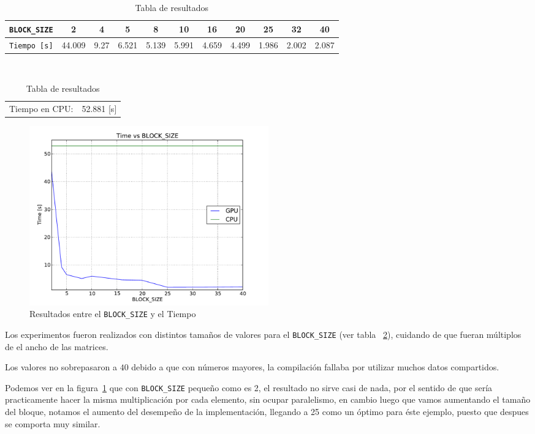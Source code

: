 \begin{table}[!ht]
\begin{center}
	\begin{tabular}{|l|c|c|c|c|c|c|c|c|c|c|}
		\hline
		\texttt{BLOCK\_SIZE} & 2 & 4 & 5 & 8 & 10 & 16 & 20 & 25 & 32 & 40 \\\hline
		\texttt{Tiempo [s]}  & 44.009 & 9.27 & 6.521 & 5.139 & 5.991 & 4.659 & 4.499 & 1.986 & 2.002 & 2.087 \\\hline
	\end{tabular}
	\\
	\begin{tabular}{cc}
		Tiempo en CPU: & 52.881 [s] \\
	\end{tabular}
\end{center}
\caption{Tabla de resultados}
\label{table:1}
\end{table}

\begin{figure}
\begin{center}
	\includegraphics[width=0.5\textwidth]{img/plot-proyecto.pdf}
\end{center}
\caption{Resultados entre el \texttt{BLOCK\_SIZE} y el Tiempo}
\label{fig:1}
\end{figure}

Los experimentos fueron realizados con distintos tamaños de
valores para el \texttt{BLOCK\_SIZE} (ver tabla ~\ref{table:1}), cuidando de que fueran
múltiplos de el ancho de las matrices.

Los valores no sobrepasaron a $40$ debido a que con números
mayores, la compilación fallaba por utilizar muchos datos compartidos.

Podemos ver en la figura~\ref{fig:1} que con \texttt{BLOCK\_SIZE} pequeño como es 2,
el resultado no sirve casi de nada, por el sentido de que sería practicamente hacer
la misma multiplicación por cada elemento, sin ocupar paralelismo,
en cambio luego que vamos aumentando el tamaño del bloque,
notamos el aumento del desempeño de la implementación, llegando
a 25 como un óptimo para éste ejemplo, puesto que despues se comporta
muy similar.

